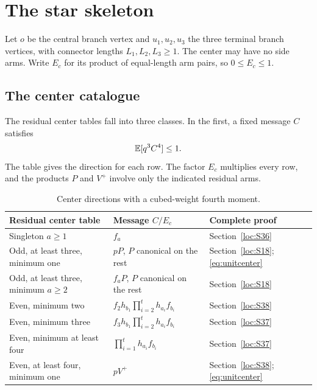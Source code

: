 \section{The star skeleton}\label{sec:star}
Let $o$ be the central branch vertex and $u_1,u_2,u_3$ the three terminal branch vertices, with connector lengths $L_1,L_2,L_3\ge1$. The center may have no side arms. Write $E_c$ for its product of equal-length arm pairs, so $0\le E_c\le1$.

\subsection{The center catalogue}
The residual center tables fall into three classes. In the first, a fixed message $C$ satisfies
\begin{equation}\label{eq:center3}
 \mathbb E[q^3C^4]\le1.
\end{equation}
The table gives the direction for each row. The factor $E_c$ multiplies every row, and the products $P$ and $V^+$ involve only the indicated residual arms.

\begin{table}[htbp]
\centering
\caption{Center directions with a cubed-weight fourth moment.}\label{tab:center}
\fontsize{9}{11}\selectfont
\setlength{\tabcolsep}{1pt}\noindent\begin{tabular}{@{}p{56mm}p{66mm}p{32mm}@{}}
\toprule
Residual center table & Message $C/E_c$ & Complete proof\\\midrule
Singleton $a\ge1$ & $f_a$ & Section~\ref{loc:S36}\\
Odd, at least three, minimum one & $pP$, $P$ canonical on the rest & Section~\ref{loc:S18}; \eqref{eq:unitcenter}\\
Odd, at least three, minimum $a\ge2$ & $f_aP$, $P$ canonical on the rest & Section~\ref{loc:S18}\\
Even, minimum two & $f_2h_{b_1}\prod_{i=2}^t h_{a_i}f_{b_i}$ & Section~\ref{loc:S38}\\
Even, minimum three & $f_3h_{b_1}\prod_{i=2}^t h_{a_i}f_{b_i}$ & Section~\ref{loc:S37}\\
Even, minimum at least four & $\prod_{i=1}^t h_{a_i}f_{b_i}$ & Section~\ref{loc:S37}\\
Even, at least four, minimum one & $pV^+$ & Section~\ref{loc:S38}; \eqref{eq:unitcenter}\\
\bottomrule
\end{tabular}

\end{table}

